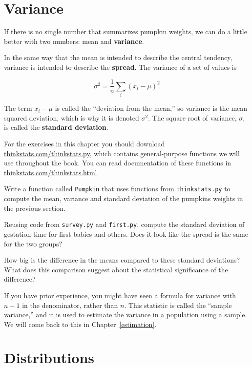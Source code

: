 \documentclass[12pt]{book}
\begin{document}
\section{Variance}

If there is no single number that summarizes pumpkin weights,
we can do a little better with two numbers: mean and {\bf variance}.

In the same way that the mean is intended to describe the central
tendency, variance is intended to describe the {\bf spread}.
The variance of a set of values is

\[ \sigma^2 = \frac{1}{n} \sum_i (x_i - \mu)^2 \]

The term $x_i - \mu$ is called the ``deviation from the mean,'' so
variance is the mean squared deviation, which is why it is denoted
$\sigma^2$.  The square root of variance, $\sigma$, is called the {\bf
  standard deviation}.

\begin{ex}
For the exercises in this chapter you should download
\url{thinkstats.com/thinkstats.py}, which contains general-purpose
functions we will use throughout the book.  You can read documentation
of these functions in \url{thinkstats.com/thinkstats.html}.

Write a function called
{\tt Pumpkin} that uses functions from {\tt thinkstats.py} to compute
the mean, variance and standard deviation of the pumpkins weights in
the previous section.
\end{ex}

\begin{ex}
Reusing code from {\tt survey.py} and {\tt first.py}, compute the
standard deviation of gestation time for first babies and others.
Does it look like the spread is the same for the two groups?

How big is the difference in the means compared to these standard
deviations?  What does this comparison suggest about the statistical
significance of the difference?
\end{ex}

If you have prior experience, you might have seen a 
formula for variance with $n-1$ in the denominator, rather than $n$.
This statistic is called the ``sample variance,'' and it is used
to estimate the variance in a population using a sample.  We will
come back to this in Chapter~\ref{estimation}.

\section{Distributions}
\label{distributions}
\end{document}
